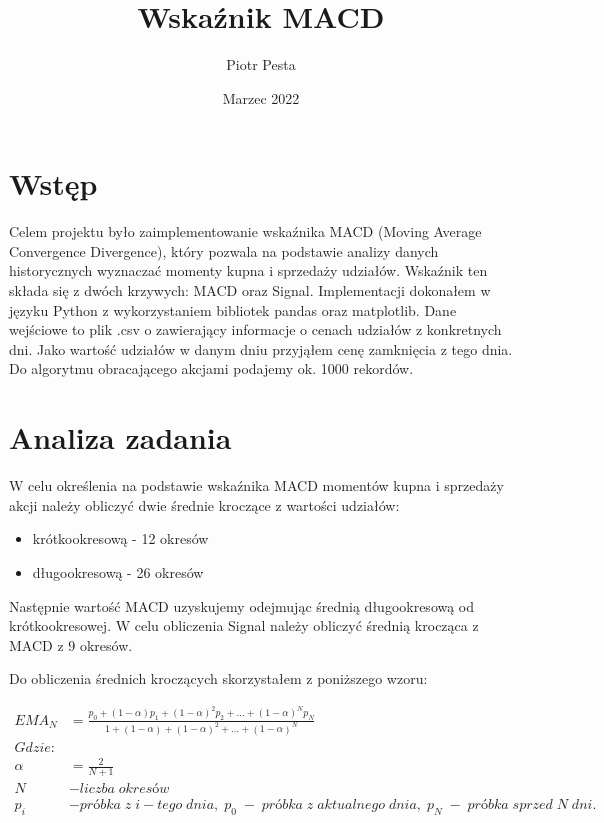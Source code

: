 \documentclass{article}
\title{Wskaźnik MACD}
\author{Piotr Pesta}
\date{Marzec 2022}
\begin{document}
\maketitle

\section{Wstęp}

    Celem projektu było zaimplementowanie wskaźnika MACD (Moving Average Convergence Divergence), który pozwala na podstawie analizy danych historycznych
    wyznaczać momenty kupna i sprzedaży udziałów. Wskaźnik ten składa się z dwóch krzywych: MACD oraz Signal.
    Implementacji dokonałem w języku Python z wykorzystaniem bibliotek pandas oraz matplotlib.
    Dane wejściowe to plik .csv o zawierający informacje o cenach udziałów z konkretnych dni. 
    Jako wartość udziałów w danym dniu przyjąłem cenę zamknięcia z tego dnia. Do algorytmu obracającego akcjami podajemy ok. 1000 rekordów.

\section{Analiza zadania}

    W celu określenia na podstawie wskaźnika MACD momentów kupna i sprzedaży akcji należy obliczyć
    dwie średnie kroczące z wartości udziałów:
    \begin{itemize}
        \item krótkookresową - 12 okresów
        \item długookresową - 26 okresów
    \end{itemize}

    \noindent Następnie wartość MACD uzyskujemy odejmując średnią długookresową od krótkookresowej.
    W celu obliczenia Signal należy obliczyć średnią krocząca z MACD z 9 okresów. 


    Do obliczenia średnich kroczących skorzystałem z poniższego wzoru:
 
        

    \begin{align*} 
        EMA_{N} &= \frac{p_{0} + (1-\alpha)p_{1} + (1-\alpha)^2p_{2} + \ldots + (1-\alpha)^Np_{N}}{1 + (1-\alpha)+(1-\alpha)^2 + \ldots + (1-\alpha)^N} \\
        \mathit{Gdzie:} & \\
        \alpha &= \frac{2}{N + 1} \\
        N &- liczba \; okres \mathit{ó} w \\
        p_{i} &- pr\mathit{ó}bka \; z \; i-tego \;dnia, \;p_{0}\; - \; pr\mathit{ó}bka \;z \;aktualnego \;dnia, \;p_{N} \;-\;pr\mathit{ó}bka \;sprzed \;N \;dni.
    \end{align*}
\end{document}
